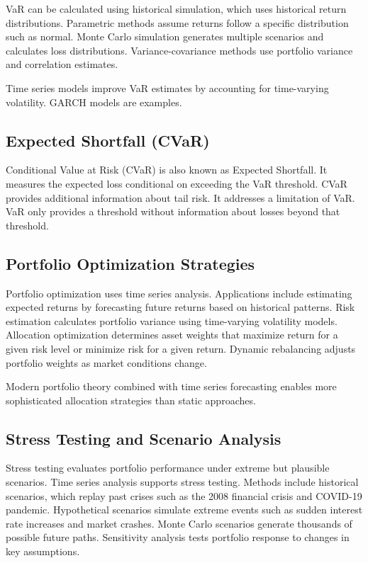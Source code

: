 VaR can be calculated using historical simulation, which uses historical return distributions. Parametric methods assume returns follow a specific distribution such as normal. Monte Carlo simulation generates multiple scenarios and calculates loss distributions. Variance-covariance methods use portfolio variance and correlation estimates.

Time series models improve VaR estimates by accounting for time-varying volatility. GARCH models are examples.

\subsection{Expected Shortfall (CVaR)}

Conditional Value at Risk (CVaR) is also known as Expected Shortfall. It measures the expected loss conditional on exceeding the VaR threshold. CVaR provides additional information about tail risk. It addresses a limitation of VaR. VaR only provides a threshold without information about losses beyond that threshold.

\subsection{Portfolio Optimization Strategies}

Portfolio optimization uses time series analysis. Applications include estimating expected returns by forecasting future returns based on historical patterns. Risk estimation calculates portfolio variance using time-varying volatility models. Allocation optimization determines asset weights that maximize return for a given risk level or minimize risk for a given return. Dynamic rebalancing adjusts portfolio weights as market conditions change.

Modern portfolio theory combined with time series forecasting enables more sophisticated allocation strategies than static approaches.

\subsection{Stress Testing and Scenario Analysis}

Stress testing evaluates portfolio performance under extreme but plausible scenarios. Time series analysis supports stress testing. Methods include historical scenarios, which replay past crises such as the 2008 financial crisis and COVID-19 pandemic. Hypothetical scenarios simulate extreme events such as sudden interest rate increases and market crashes. Monte Carlo scenarios generate thousands of possible future paths. Sensitivity analysis tests portfolio response to changes in key assumptions.


